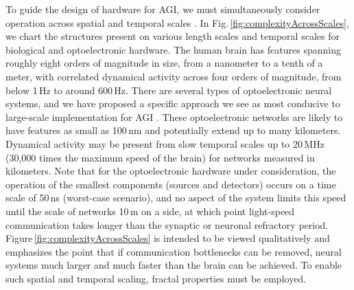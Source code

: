 \documentclass[twocolumn]{article}
\begin{document}
To guide the design of hardware for AGI, we must simultaneously consider operation across spatial and temporal scales \cite{beba2016}. In Fig.\,\ref{fig:complexityAcrossScales}, we chart the structures present on various length scales and temporal scales for biological and optoelectronic hardware. The human brain has features spanning roughly eight orders of magnitude in size, from a nanometer to a tenth of a meter, with correlated dynamical activity across four orders of magnitude, from below 1\,Hz to around 600\,Hz. There are several types of optoelectronic neural systems, and we have proposed a specific approach we see as most conducive to large-scale implementation for AGI \cite{sh2018a}. These optoelectronic networks are likely to have features as small as 100\,nm and potentially extend up to many kilometers. Dynamical activity may be present from slow temporal scales up to 20\,MHz (30,000 times the maximum speed of the brain) for networks measured in kilometers. Note that for the optoelectronic hardware under consideration, the operation of the smallest components (sources and detectors) occurs on a time scale of 50\,ns (worst-case scenario), and no aspect of the system limits this speed until the scale of networks 10\,m on a side, at which point light-speed communication takes longer than the synaptic or neuronal refractory period. Figure\,\ref{fig:complexityAcrossScales} is intended to be viewed qualitatively and emphasizes the point that if communication bottlenecks can be removed, neural systems much larger and much faster than the brain can be achieved. To enable such spatial and temporal scaling, fractal properties must be employed. 
\end{document}
